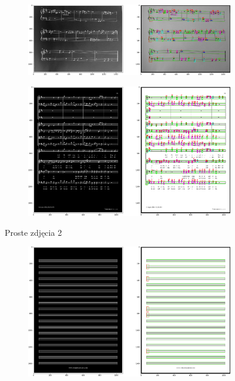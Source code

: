 \documentclass[12pt]{article}
\begin{document}
\begin{enumerate}
\begin{figure}[h!]
\begin{subfigure}[b]{0.48\linewidth}
					\includegraphics[width=\linewidth]{Eazy/Zdj18.png}
				\end{subfigure}
				\begin{subfigure}[b]{0.48\linewidth}
					\includegraphics[width=\linewidth]{Eazy/Zdj19.png}
				\end{subfigure}
				\label{fig:nuuty3}
				\caption{Proste zdjęcia 2}
			\end{figure}
			\begin{figure}[h!]
				\centering
				\begin{subfigure}[b]{0.48\linewidth}
					\includegraphics[width=\linewidth]{Eazy/Zdj20.png}

\end{subfigure}
\end{figure}
\end{enumerate}
\end{document}
